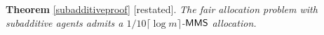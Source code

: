 \begin{comment}
Next, via a probabilistic argument, we show that the objective function of LP \ref{oo2} is at least $f(\domp(f))/\lceil 2\log |\domp(f)|\rceil$. To this end, consider the following randomized procedure:
\begin{itemize}
	\item Let $S^*$ be an empty set.
	\item Iterate over all sets $S \subseteq \domp(f)$.
	\begin{itemize}
		\item For every set $S$, with probability $\alpha_S$ set $S^* = S^* \cup S$
	\end{itemize}
\end{itemize}
We show that every element $\ite_j$ appears in $S^*$ with probability at least $1/2$. Moreover, the expected value of $f(S^*)$ is no more than the objective value of LP \ref{oo2}. Based on this, we show that $$\mathbb{E}[f(S^*)] \geq f(\domp(f))/\lceil 2\log |\domp(f)|\rceil.$$ The crux of the argument is that if we use the same randomized procedure and generate $O(\log m)$ independent sets, the union of these sets contains all of the elements with a considerable probability. On the other hand, since the function is subadditive, its value for the union of the sets is no less than the total sum of the values for the sets. This proves $\mathbb{E}[f(S^*)] \geq f(\domp(f))/\lceil 2\log |\domp(f)|\rceil$ which implies the lemma.
 This lemma as a black box shows that every subadditive function $f$ can be approximated via an XOS function whose $\MMS$ is within a factor $1/2\lceil \log |\domp(f)|\rceil$ of its maxmin value. 
As an immediate corollary of Lemma \ref{rr1}, we show that the fair allocation problem with subadditive agents admits a $1/10 \lceil\log m\rceil$-$\MMS$ allocation.
\end{comment}

\vspace{0.2cm}
{\noindent \textbf{Theorem} \ref{subadditiveproof} [restated].\textit{ The fair allocation problem with subadditive agents admits a $1/10 \lceil\log m\rceil$-$\mathsf{MMS}$ allocation.\\}}

